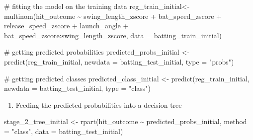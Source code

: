 \documentclass[
  letterpaper,
  DIV=11,
  numbers=noendperiod]{scrartcl}
\newenvironment{Shaded}{\begin{snugshade}}{\end{snugshade}}
\newcommand{\AttributeTok}[1]{\textcolor[rgb]{0.40,0.45,0.13}{#1}}
\newcommand{\CommentTok}[1]{\textcolor[rgb]{0.37,0.37,0.37}{#1}}
\newcommand{\FunctionTok}[1]{\textcolor[rgb]{0.28,0.35,0.67}{#1}}
\newcommand{\NormalTok}[1]{\textcolor[rgb]{0.00,0.23,0.31}{#1}}
\newcommand{\OtherTok}[1]{\textcolor[rgb]{0.00,0.23,0.31}{#1}}
\newcommand{\SpecialCharTok}[1]{\textcolor[rgb]{0.37,0.37,0.37}{#1}}
\newcommand{\StringTok}[1]{\textcolor[rgb]{0.13,0.47,0.30}{#1}}
\providecommand{\tightlist}{%
  \setlength{\itemsep}{0pt}\setlength{\parskip}{0pt}}\usepackage{longtable,booktabs,array}
\begin{document}
\begin{Shaded}
\begin{Highlighting}[]
\CommentTok{\# fitting the model on the training data }
\NormalTok{reg\_train\_initial}\OtherTok{\textless{}{-}} \FunctionTok{multinom}\NormalTok{(hit\_outcome }\SpecialCharTok{\textasciitilde{}}
\NormalTok{                          swing\_length\_zscore }\SpecialCharTok{+}
\NormalTok{                          bat\_speed\_zscore }\SpecialCharTok{+}
\NormalTok{                          release\_speed\_zscore }\SpecialCharTok{+}
\NormalTok{                          launch\_angle }\SpecialCharTok{+}
\NormalTok{                          bat\_speed\_zscore}\SpecialCharTok{:}\NormalTok{swing\_length\_zscore,}
                        \AttributeTok{data =}\NormalTok{ batting\_train\_initial)}

\CommentTok{\# getting predicted probabilities }
\NormalTok{predicted\_probs\_initial }\OtherTok{\textless{}{-}} \FunctionTok{predict}\NormalTok{(reg\_train\_initial,}
                           \AttributeTok{newdata =}\NormalTok{ batting\_test\_initial,}
                           \AttributeTok{type =} \StringTok{"probs"}\NormalTok{)}

\CommentTok{\# getting predicted classes }
\NormalTok{predicted\_class\_initial }\OtherTok{\textless{}{-}} \FunctionTok{predict}\NormalTok{(reg\_train\_initial,}
                           \AttributeTok{newdata =}\NormalTok{ batting\_test\_initial,}
                           \AttributeTok{type =} \StringTok{"class"}\NormalTok{)}
\end{Highlighting}
\end{Shaded}

\begin{enumerate}
\def\labelenumi{\arabic{enumi}.}
\setcounter{enumi}{2}
\tightlist
\item
  Feeding the predicted probabilities into a decision tree
\end{enumerate}

\begin{Shaded}
\begin{Highlighting}[]
\NormalTok{stage\_2\_tree\_initial }\OtherTok{\textless{}{-}} \FunctionTok{rpart}\NormalTok{(hit\_outcome }\SpecialCharTok{\textasciitilde{}}
\NormalTok{                        predicted\_probs\_initial,}
                      \AttributeTok{method =} \StringTok{"class"}\NormalTok{,}
                      \AttributeTok{data =}\NormalTok{ batting\_test\_initial)}
\end{Highlighting}
\end{Shaded}
\end{document}

